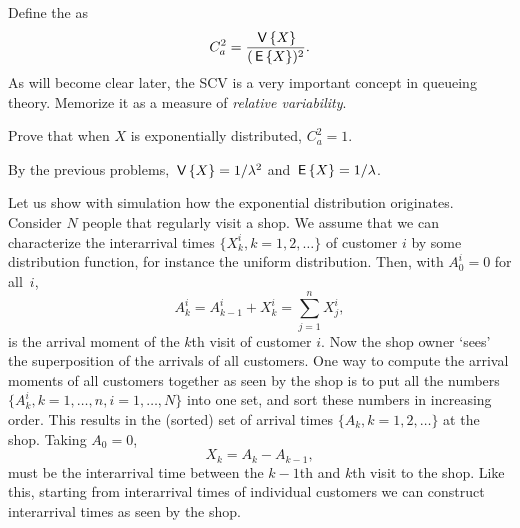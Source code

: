 Define the  as
  \begin{equation}
C_a^2 = \frac{\,\mathsf{V}\left\{X\right\}}{(\,\mathsf{E}\left\{X\right\})^2}.
  \end{equation}
As
  will become clear later, the SCV is a very important concept in
  queueing theory. Memorize it as a measure of \emph{relative
  variability}.

\begin{exercise}
  Prove that when $X$ is exponentially distributed, $C_a^2 =1$.  
\begin{solution}
  By the previous problems, $\,\mathsf{V}\left\{X\right\} = 1/\lambda^2$ and $\,\mathsf{E}\left\{X\right\}=1/\lambda$.
\end{solution}
\end{exercise}


Let us show with simulation how the exponential distribution
originates. Consider $N$ people that regularly visit a shop. We assume
that we can characterize the interarrival times
$\{X_k^i, k=1,2, \ldots\}$ of customer $i$ by some distribution
function, for instance the uniform distribution. Then, with
$A_{0}^i=0$ for all~$i$,
\begin{equation*}
A_k^i = A_{k-1}^i + X_k^i = \sum_{j=1}^n X_j^i,
\end{equation*}
is the arrival moment of the $k$th visit of customer $i$.  Now the
shop owner `sees' the superposition of the arrivals of all
customers. One way to compute the arrival moments of all customers
together as seen by the shop is to put all the numbers
$\{A_k^i, k=1,\ldots,n, i=1,\ldots,N\}$ into one set, and sort these
numbers in increasing order. This results in the (sorted) set of
arrival times $\{A_k, k=1,2,\ldots\}$ at the shop. Taking $A_0=0$, 
\begin{equation*}
X_k = A_k - A_{k-1},
\end{equation*}
must be the interarrival time between the $k-1$th and
$k$th visit to the shop.  Like this, starting from interarrival times of
individual customers we can construct interarrival times as seen by
the shop.


